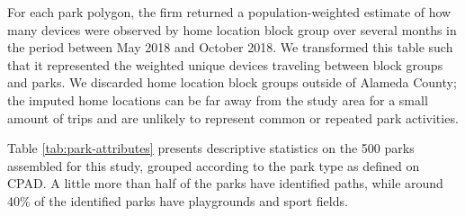 \documentclass[3p, authoryear]{elsarticle} %
\begin{document}
For each park polygon, the firm returned a population-weighted estimate of how
many devices were observed by home location block group over several months in
the period between May 2018 and October 2018. We transformed this table such
that it represented the weighted unique devices traveling between block groups
and parks. We discarded home location block groups outside of Alameda County;
the imputed home locations can be far away from the study area for a small
amount of trips and are unlikely to represent common or repeated park
activities.

Table \ref{tab:park-attributes} presents descriptive statistics
on the 500 parks assembled for this study, grouped according to the
park type as defined on CPAD. A little more than half of the parks have
identified paths, while around 40\% of the identified parks have playgrounds and
sport fields.
\end{document}
